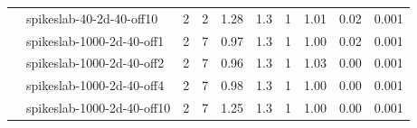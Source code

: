 \begin{tabular}{ll|rrcccccc}
                     & spikeslab-40-2d-40-off10 & 2   & 2    & 1.28 & 1.3 &    1 & 1.01 & 0.02 & 0.001 \\
                     & spikeslab-1000-2d-40-off1 & 2   & 7    & 0.97 & 1.3 &    1 & 1.00 & 0.02 & 0.001 \\
                     & spikeslab-1000-2d-40-off2 & 2   & 7    & 0.96 & 1.3 &    1 & 1.03 & 0.00 & 0.001 \\
                     & spikeslab-1000-2d-40-off4 & 2   & 7    & 0.98 & 1.3 &    1 & 1.00 & 0.00 & 0.001 \\
                     & spikeslab-1000-2d-40-off10 & 2   & 7    & 1.25 & 1.3 &    1 & 1.00 & 0.00 & 0.001 \\
\end{tabular}

